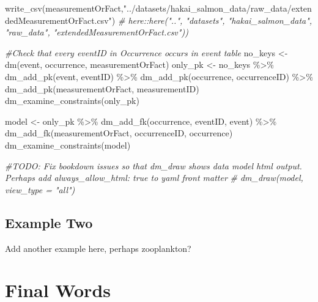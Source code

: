 \documentclass[
]{book}
\newenvironment{Shaded}{\begin{snugshade}}{\end{snugshade}}
\newcommand{\CommentTok}[1]{\textcolor[rgb]{0.56,0.35,0.01}{\textit{#1}}}
\newcommand{\FunctionTok}[1]{\textcolor[rgb]{0.00,0.00,0.00}{#1}}
\newcommand{\NormalTok}[1]{#1}
\newcommand{\OtherTok}[1]{\textcolor[rgb]{0.56,0.35,0.01}{#1}}
\newcommand{\SpecialCharTok}[1]{\textcolor[rgb]{0.00,0.00,0.00}{#1}}
\newcommand{\StringTok}[1]{\textcolor[rgb]{0.31,0.60,0.02}{#1}}
\begin{document}
\begin{Shaded}
\begin{Highlighting}[]
\FunctionTok{write\_csv}\NormalTok{(measurementOrFact,}\StringTok{"../datasets/hakai\_salmon\_data/raw\_data/extendedMeasurementOrFact.csv"}\NormalTok{) }\CommentTok{\# here::here("..", "datasets", "hakai\_salmon\_data", "raw\_data",   "extendedMeasurementOrFact.csv"))}
\end{Highlighting}
\end{Shaded}

\begin{Shaded}
\begin{Highlighting}[]
\CommentTok{\#Check that every eventID in Occurrence occurs in event table}
\NormalTok{no\_keys }\OtherTok{\textless{}{-}} \FunctionTok{dm}\NormalTok{(event, occurrence, measurementOrFact)}
\NormalTok{only\_pk }\OtherTok{\textless{}{-}}\NormalTok{ no\_keys }\SpecialCharTok{\%\textgreater{}\%} 
  \FunctionTok{dm\_add\_pk}\NormalTok{(event, eventID) }\SpecialCharTok{\%\textgreater{}\%} 
  \FunctionTok{dm\_add\_pk}\NormalTok{(occurrence, occurrenceID) }\SpecialCharTok{\%\textgreater{}\%} 
  \FunctionTok{dm\_add\_pk}\NormalTok{(measurementOrFact, measurementID)}
\FunctionTok{dm\_examine\_constraints}\NormalTok{(only\_pk)}

\NormalTok{model }\OtherTok{\textless{}{-}}\NormalTok{ only\_pk }\SpecialCharTok{\%\textgreater{}\%} 
  \FunctionTok{dm\_add\_fk}\NormalTok{(occurrence, eventID, event) }\SpecialCharTok{\%\textgreater{}\%} 
  \FunctionTok{dm\_add\_fk}\NormalTok{(measurementOrFact, occurrenceID, occurrence)}
\FunctionTok{dm\_examine\_constraints}\NormalTok{(model)}

\CommentTok{\#TODO: Fix bookdown issues so that dm\_draw shows data model html output. Perhaps add  \textasciigrave{}always\_allow\_html: true\textasciigrave{} to yaml front matter}
\CommentTok{\# dm\_draw(model, view\_type = "all") }
\end{Highlighting}
\end{Shaded}

\hypertarget{example-two}{%
\section{Example Two}\label{example-two}}

Add another example here, perhaps zooplankton?

\hypertarget{final-words}{%
\chapter{Final Words}\label{final-words}}
\end{document}
